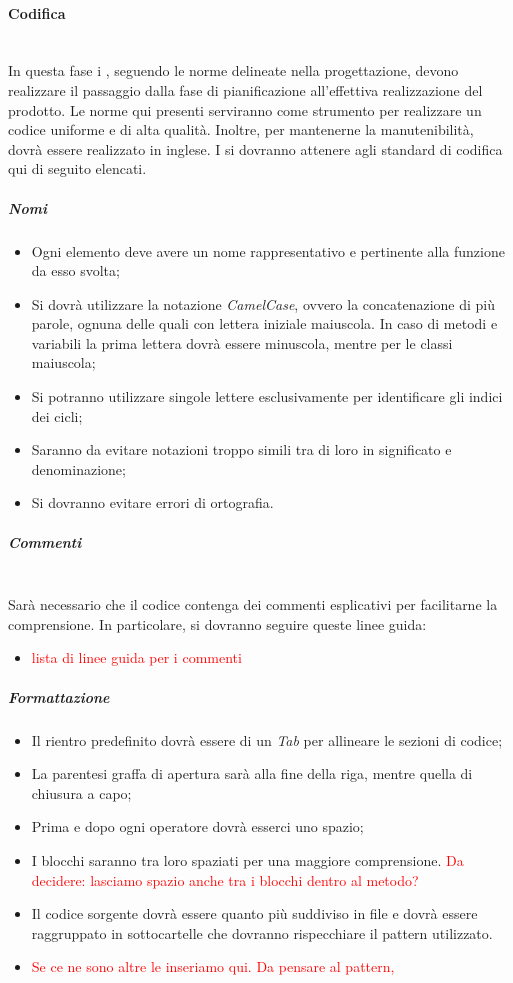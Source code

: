 	\paragraph{Codifica}
	~\\In questa fase i \progrs, seguendo le norme delineate nella progettazione, devono realizzare il passaggio dalla fase di pianificazione all'effettiva realizzazione del prodotto.
	Le norme qui presenti serviranno come strumento per realizzare un codice uniforme e di alta qualità. Inoltre, per mantenerne la manutenibilità, dovrà essere realizzato in inglese.
	I \progrs{} si dovranno attenere agli standard di codifica qui di seguito elencati.
	\subparagraph{Nomi}
	\begin{itemize}
		\item Ogni elemento deve avere un nome rappresentativo e pertinente alla funzione da esso svolta;
		\item Si dovrà utilizzare la notazione \emph{CamelCase}, ovvero la concatenazione di più parole, ognuna delle quali con lettera iniziale maiuscola. In caso di metodi e variabili la prima lettera dovrà essere minuscola, mentre per le classi maiuscola;
		\item Si potranno utilizzare singole lettere esclusivamente per identificare gli indici dei cicli;
		\item Saranno da evitare notazioni troppo simili tra di loro in significato e denominazione;
		\item Si dovranno evitare errori di ortografia.
	\end{itemize}
	\subparagraph{Commenti}
	~\\Sarà necessario che il codice contenga dei commenti esplicativi per facilitarne la comprensione.
	\newline In particolare, si dovranno seguire queste linee guida:
	\begin{itemize}
		\item \textcolor{red}{lista di linee guida per i commenti}
	\end{itemize}
	\subparagraph{Formattazione}
	\begin{itemize} 
		\item Il rientro predefinito dovrà essere di un \emph{Tab} per allineare le sezioni di codice;
		\item La parentesi graffa di apertura sarà alla fine della riga, mentre quella di chiusura a capo;
		\item Prima e dopo ogni operatore dovrà esserci uno spazio;
		\item I blocchi saranno tra loro spaziati per una maggiore comprensione. \textcolor{red}{Da decidere: lasciamo spazio anche tra i blocchi dentro al metodo?}
		\item Il codice sorgente dovrà essere quanto più suddiviso in file e dovrà essere raggruppato in sottocartelle che dovranno rispecchiare il pattern utilizzato.
		\item \textcolor{red}{Se ce ne sono altre le inseriamo qui. Da pensare al pattern, }
	\end{itemize}
